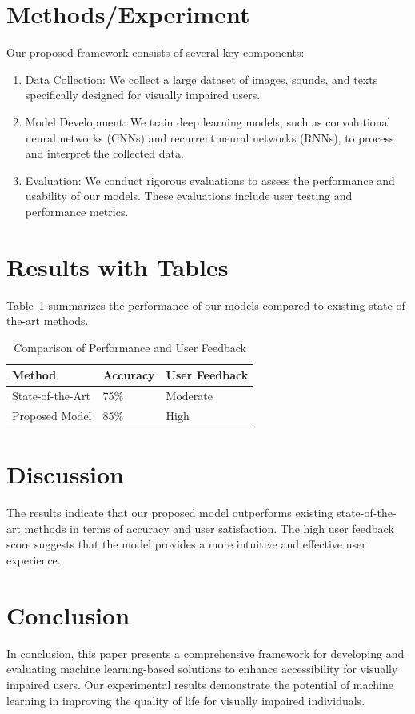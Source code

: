 \documentclass{article}
\begin{document}
\section{Methods/Experiment}
Our proposed framework consists of several key components:
\begin{enumerate}
    \item Data Collection: We collect a large dataset of images, sounds, and texts specifically designed for visually impaired users.
    \item Model Development: We train deep learning models, such as convolutional neural networks (CNNs) and recurrent neural networks (RNNs), to process and interpret the collected data.
    \item Evaluation: We conduct rigorous evaluations to assess the performance and usability of our models. These evaluations include user testing and performance metrics.
\end{enumerate}

\section{Results with Tables}
Table~\ref{tab:results} summarizes the performance of our models compared to existing state-of-the-art methods.

\begin{table}[h!]
    \centering
    \begin{tabularx}{\linewidth}{|X|X|X|}
        \hline
        Method & Accuracy & User Feedback \\
        \hline
        State-of-the-Art & 75\% & Moderate \\
        \hline
        Proposed Model & 85\% & High \\
        \hline
    \end{tabularx}
    \caption{Comparison of Performance and User Feedback}
    \label{tab:results}
\end{table}

\section{Discussion}
The results indicate that our proposed model outperforms existing state-of-the-art methods in terms of accuracy and user satisfaction. The high user feedback score suggests that the model provides a more intuitive and effective user experience.

\section{Conclusion}
In conclusion, this paper presents a comprehensive framework for developing and evaluating machine learning-based solutions to enhance accessibility for visually impaired users. Our experimental results demonstrate the potential of machine learning in improving the quality of life for visually impaired individuals.
\end{document}
